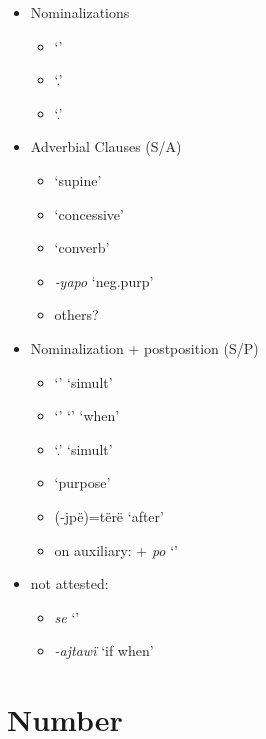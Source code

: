 \documentclass{memoir}
\begin{document}
\begin{itemize}
\tightlist
\item
  Nominalizations

  \begin{itemize}
  \tightlist
  \item
     `'
  \item
     `.'
  \item
     `.'
  \end{itemize}
\item
  Adverbial Clauses (S/A)

  \begin{itemize}
  \tightlist
  \item
     `supine'
  \item
     `concessive'
  \item
     `converb'
  \item
    \emph{‑yapo} `neg.purp'
  \item
    others?
  \end{itemize}
\item
  Nominalization + postposition (S/P)

  \begin{itemize}
  \tightlist
  \item
     `' `simult'
  \item
     `'  `' `when'
  \item
     `.' `simult'
  \item
     `purpose'
  \item
    (‑jpë)=tërë `after'
  \item
    on auxiliary:  + \emph{po} `'
  \end{itemize}
\item
  not attested:

  \begin{itemize}
  \tightlist
  \item
    \emph{se} `'
  \item
    \emph{-ajtawï} `if when'
  \end{itemize}
\end{itemize}

\section{\texorpdfstring{Number \label{sec:verbalnumber}}{Number }}
\end{document}
